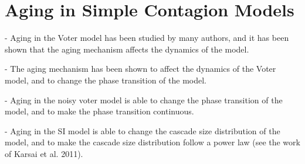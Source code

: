 \section{\label{sec:Aging in Simple Contagion Models} Aging in Simple Contagion Models}

- Aging in the Voter model has been studied by many authors, and it has been shown that the aging mechanism affects the dynamics of the model.

- The aging mechanism has been shown to affect the dynamics of the Voter model, and to change the phase transition of the model.

- Aging in the noisy voter model is able to change the phase transition of the model, and to make the phase transition continuous.

- Aging in the SI model is able to change the cascade size distribution of the model, and to make the cascade size distribution follow a power law (see the work of Karsai et al. 2011).